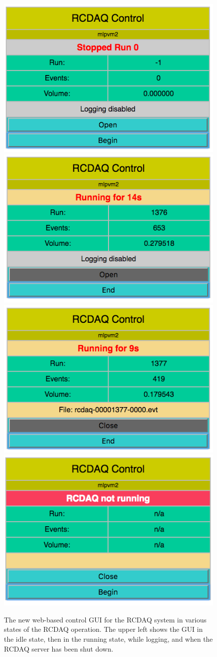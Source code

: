 \documentclass{article}[11pt]
\begin{document}
\begin{figure}[htb]
  \begin{center}
    \includegraphics[width=0.47\columnwidth]{webcontrol_idle.png}
    \includegraphics[width=0.47\columnwidth]{webcontrol_running.png}
    \includegraphics[width=0.47\columnwidth]{webcontrol_logging.png}
    \includegraphics[width=0.47\columnwidth]{webcontrol_shutdown.png}
  \end{center}
  \caption{\label{webcontrol-idle}The new web-based control GUI for the RCDAQ system
    in various states of the RCDAQ operation. The upper left shows the GUI in the idle state, 
    then in the running state, while logging, and when the RCDAQ server has been shut down.}
\end{figure}
\end{document}
